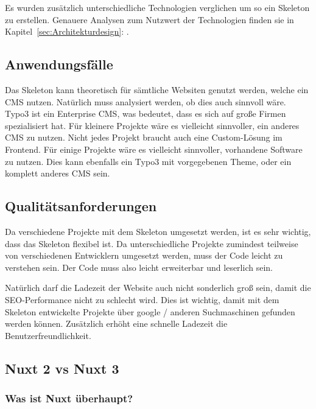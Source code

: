 Es wurden zusätzlich unterschiedliche Technologien verglichen um so ein Skeleton zu erstellen. Genauere Analysen zum Nutzwert der Technologien finden sie in Kapitel~\ref{sec:Architekturdesign}: . 


\subsection{Anwendungsfälle}
\label{sec:Anwendungsfaelle}

Das Skeleton kann theoretisch für sämtliche Websiten genutzt werden, welche ein \acs{CMS} nutzen. Natürlich muss analysiert werden, ob dies auch sinnvoll wäre. Typo3 ist ein Enterprise \acs{CMS}, was bedeutet, dass es sich auf große Firmen spezialisiert hat. Für kleinere Projekte wäre es vielleicht sinnvoller, ein anderes \acs{CMS} zu nutzen. Nicht jedes Projekt braucht auch eine Custom-Lösung im Frontend. Für einige Projekte wäre es vielleicht sinnvoller, vorhandene Software zu nutzen. Dies kann ebenfalls ein Typo3 mit vorgegebenen Theme, oder ein komplett anderes \acs{CMS} sein.

\subsection{Qualitätsanforderungen}
\label{sec:Qualitaetsanforderungen}

Da verschiedene Projekte mit dem Skeleton umgesetzt werden, ist es sehr wichtig, dass das Skeleton flexibel ist. Da unterschiedliche Projekte zumindest teilweise von verschiedenen Entwicklern umgesetzt werden, muss der Code leicht zu verstehen sein. Der Code muss also leicht erweiterbar und leserlich sein.

Natürlich darf die Ladezeit der Website auch nicht sonderlich groß sein, damit die SEO-Performance nicht zu schlecht wird. Dies ist wichtig, damit mit dem Skeleton entwickelte Projekte über google / anderen Suchmaschinen gefunden werden können. Zusätzlich erhöht eine schnelle Ladezeit die Benutzerfreundlichkeit.

\subsection{Nuxt 2 vs Nuxt 3}
\label{sec:Nuxt 2 vs Nuxt 3}

\subsubsection{Was ist Nuxt überhaupt?}
\label{sec:Was ist Nuxt überhaupt?}

